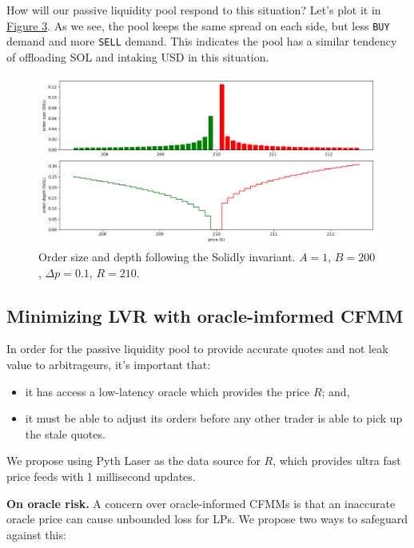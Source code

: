 \documentclass{article}
\begin{document}
How will our passive liquidity pool respond to this situation? Let's plot it in \hyperref[fig:3]{Figure 3}. As we see, the pool keeps the same spread on each side, but less \texttt{BUY} demand and more \texttt{SELL} demand. This indicates the pool has a similar tendency of offloading SOL and intaking USD in this situation.

\begin{figure}
  \centering
  \includegraphics[width=\textwidth]{3-solidly-price-jump.png}
  \caption{Order size and depth following the Solidly invariant. $A = 1$, $B = 200$, $\Delta p = 0.1$, $R = 210$.}
  \label{fig:3}
\end{figure}

\subsection{Minimizing LVR with oracle-imformed CFMM}

In order for the passive liquidity pool to provide accurate quotes and not leak value to arbitrageurs, it's important that:

\begin{itemize}
  \item it has access a low-latency oracle which provides the price $R$; and,
  \item it must be able to adjust its orders before any other trader is able to pick up the stale quotes.
\end{itemize}

We propose using Pyth Laser\supercite{pythlaser} as the data source for $R$, which provides ultra fast price feeds with 1 millisecond updates.

\textbf{On oracle risk.} A concern over oracle-informed CFMMs is that an inaccurate oracle price can cause unbounded loss for LPs.\supercite{riskoforacleamm} We propose two ways to safeguard against this:
\end{document}

